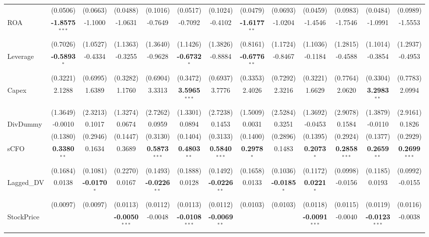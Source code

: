 \documentclass[11pt,a4paper]{article}
\begin{document}
\begin{table}[htbp]
\begin{tabular}{lcccccccccccc}
 & (0.0506) & (0.0663) & (0.0488) & (0.1016) & (0.0517) & (0.1024) & (0.0479) & (0.0693) & (0.0459) & (0.0983) & (0.0484) & (0.0989) \\
ROA & \textbf{-1.8575}$^{***}$ & -1.1000 & -1.0631 & -0.7649 & -0.7092 & -0.4102 & \textbf{-1.6177}$^{**}$ & -1.0204 & -1.4546 & -1.7546 & -1.0991 & -1.5553 \\
 & (0.7026) & (1.0527) & (1.1363) & (1.3640) & (1.1426) & (1.3826) & (0.8161) & (1.1724) & (1.1036) & (1.2815) & (1.1014) & (1.2937) \\
Leverage & \textbf{-0.5893}$^{*}$ & -0.4334 & -0.3255 & -0.9628 & \textbf{-0.6732}$^{*}$ & -0.8884 & \textbf{-0.6776}$^{**}$ & -0.8467 & -0.1184 & -0.4588 & -0.3854 & -0.4953 \\
 & (0.3221) & (0.6995) & (0.3282) & (0.6904) & (0.3472) & (0.6937) & (0.3353) & (0.7292) & (0.3221) & (0.7764) & (0.3304) & (0.7783) \\
Capex & 2.1288 & 1.6389 & 1.1760 & 3.3313 & \textbf{3.5965}$^{***}$ & 3.7776 & 2.4026 & 2.3216 & 1.6629 & 2.0620 & \textbf{3.2983}$^{**}$ & 2.0994 \\
 & (1.3649) & (2.3213) & (1.3274) & (2.7262) & (1.3301) & (2.7238) & (1.5009) & (2.5284) & (1.3692) & (2.9078) & (1.3879) & (2.9161) \\
DivDummy & -0.0010 & 0.1017 & 0.0674 & 0.0959 & 0.0894 & 0.1453 & 0.0031 & 0.3251 & -0.0453 & 0.1584 & -0.0110 & 0.1826 \\
 & (0.1380) & (0.2946) & (0.1447) & (0.3130) & (0.1404) & (0.3133) & (0.1400) & (0.2896) & (0.1395) & (0.2924) & (0.1377) & (0.2929) \\
sCFO & \textbf{0.3380}$^{**}$ & 0.1634 & 0.3689 & \textbf{0.5873}$^{***}$ & \textbf{0.4803}$^{**}$ & \textbf{0.5840}$^{***}$ & \textbf{0.2978}$^{*}$ & 0.1483 & \textbf{0.2073}$^{*}$ & \textbf{0.2858}$^{***}$ & \textbf{0.2659}$^{**}$ & \textbf{0.2699}$^{***}$ \\
 & (0.1684) & (0.1081) & (0.2270) & (0.1493) & (0.1888) & (0.1492) & (0.1658) & (0.1036) & (0.1172) & (0.0998) & (0.1185) & (0.0992) \\
Lagged\_DV & 0.0138 & \textbf{-0.0170}$^{*}$ & 0.0167 & \textbf{-0.0226}$^{**}$ & 0.0128 & \textbf{-0.0226}$^{**}$ & 0.0133 & \textbf{-0.0185}$^{*}$ & \textbf{0.0221}$^{*}$ & -0.0156 & 0.0193 & -0.0155 \\
 & (0.0097) & (0.0097) & (0.0113) & (0.0112) & (0.0113) & (0.0112) & (0.0103) & (0.0103) & (0.0118) & (0.0115) & (0.0119) & (0.0116) \\
StockPrice &  &  & \textbf{-0.0050}$^{***}$ & -0.0048 & \textbf{-0.0108}$^{***}$ & \textbf{-0.0069}$^{**}$ &  &  & \textbf{-0.0091}$^{***}$ & -0.0040 & \textbf{-0.0123}$^{***}$ & -0.0038 \\

\end{tabular}
\end{table}
\end{document}
